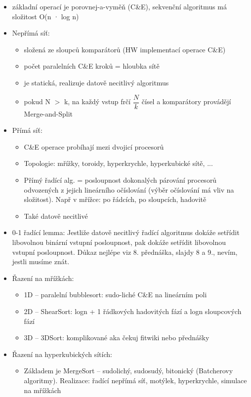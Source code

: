 \documentclass[a4paper,hidelinks]{article}
\begin{document}
\begin{itemize}
    \item základní operací je porovnej-a-vyměň (C\&E), sekvenční algoritmus má složitost O(n · log n)
    \item Nepřímá síť: 
    \begin{itemize}
        \item složená ze sloupců komparátorů (HW implementací operace C\&E)
        \item počet paralelních C\&E kroků = hloubka sítě
        \item je statická, realizuje datově necitlivý algoritmus
        \item pokud N $>$ k, na každý vstup frčí $\dfrac{N}{k}$ čísel a komparátory provádějí Merge-and-Split
    \end{itemize}
    \item Přímá síť:
    \begin{itemize}
        \item C\&E operace probíhají mezi dvojicí procesorů
        \item Topologie: mřížky, toroidy, hyperkrychle, hyperkubické sítě, ...
        \item Přímý řadící alg. = posloupnost dokonalých párování procesorů odvozených z jejich lineárního očíslování (výběr očíslování má vliv na složitost). Např v mřížce: po řádcích, po sloupcích, hadovitě
        \item Také datově necitlivé
    \end{itemize}
    \item 0-1 řadící lemma: Jestliže datově necitlivý řadící algoritmus dokáže setřídit libovolnou binární vstupní posloupnost, pak dokáže setřídit libovolnou vstupní posloupnost. Důkaz nejlépe viz 8. přednáška, slajdy 8 a 9., nevím, jestli musíme znát.
    \item Řazení na mřížkách:
    \begin{itemize}
        \item 1D -- paralelní bubblesort: sudo-liché C\&E na lineárním poli
        \item 2D -- ShearSort: logn + 1 řádkových hadovitých fází a logn sloupcových fází
        \item 3D -- 3DSort: komplikované aka čekuj fitwiki nebo přednášky
    \end{itemize}
    \item Řazení na hyperkubických sítích:
    \begin{itemize}
        \item Základem je MergeSort -- sudolichý, sudosudý, bitonický (Batcherovy algoritmy). Realizace: řadící nepřímá síť, motýlek, hyperkrychle, simulace na mřížkách
    \end{itemize}
\end{itemize}
\end{document}

